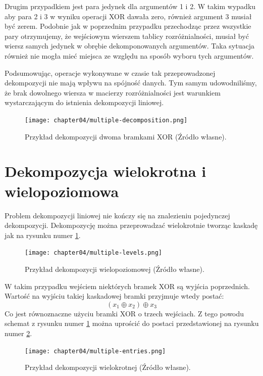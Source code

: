 Drugim przypadkiem jest para jedynek dla argumentów 1 i 2.
W takim wypadku aby para 2 i 3 w wyniku operacji XOR dawała zero,
również argument 3 musiał być zerem.
Podobnie jak w poprzednim przypadku przechodząc przez wszystkie pary otrzymujemy,
że wejściowym wierszem tablicy rozróżnialności,
musiał być wiersz samych jedynek w obrębie dekomponowanych argumentów.
Taka sytuacja również nie mogła mieć miejsca ze względu na sposób wyboru tych argumentów.

Podsumowując,
operacje wykonywane w czasie tak przeprowadzonej dekompozycji nie mają wpływu na spójność danych.
Tym samym udowodniliśmy,
że brak dowolnego wiersza w macierzy rozróżnialności jest warunkiem wystarczającym do istnienia dekompozycji liniowej.

\begin{figure}[H]
\centering
\texttt{[image: chapter04/multiple-decomposition.png]}
\caption{Przykład dekompozycji dwoma bramkami XOR (Źródło własne).}
\end{figure}

\section{Dekompozycja wielokrotna i wielopoziomowa}

Problem dekompozycji liniowej nie kończy się na znalezieniu pojedynczej dekompozycji.
Dekompozycję można przeprowadzać wielokrotnie tworząc kaskadę jak na rysunku numer \ref{fig:multiple-levels}.

\begin{figure}[H]
\centering
\texttt{[image: chapter04/multiple-levels.png]}
\caption{Przykład dekompozycji wielopoziomowej (Źródło własne).}
\label{fig:multiple-levels}
\end{figure}

W takim przypadku wejściem niektórych bramek XOR są wyjścia poprzednich.
Wartość na wyjściu takiej kaskadowej bramki przyjmuje wtedy postać:
\begin{equation}
(x_1 \oplus x_2) \oplus x_3
\end{equation}
Co jest równoznaczne użyciu bramki XOR o trzech wejściach.
Z tego powodu schemat z rysunku numer \ref{fig:multiple-levels} można uprościć do postaci przedstawionej na rysunku numer \ref{fig:multiple-entries}.

\begin{figure}[H]
\centering
\texttt{[image: chapter04/multiple-entries.png]}
\caption{Przykład dekompozycji wielokrotnej (Źródło własne).}
\label{fig:multiple-entries}
\end{figure}

